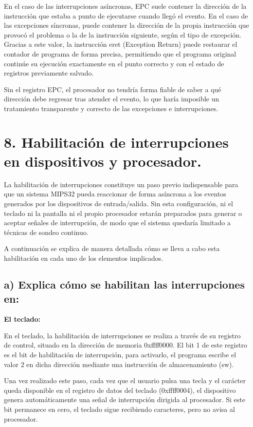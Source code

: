 \documentclass[12pt, letterpaper]{article}
\begin{document}
En el caso de las interrupciones asíncronas, EPC suele contener la dirección de la instrucción que estaba a punto de ejecutarse cuando llegó el evento. En el caso de las excepciones síncronas, puede contener la dirección de la propia instrucción que provocó el problema o la de la instrucción siguiente, según el tipo de excepción. Gracias a este valor, la instrucción eret (Exception Return) puede restaurar el contador de programa de forma precisa, permitiendo que el programa original continúe su ejecución exactamente en el punto correcto y con el estado de registros previamente salvado.

Sin el registro EPC, el procesador no tendría forma fiable de saber a qué dirección debe regresar tras atender el evento, lo que haría imposible un tratamiento transparente y correcto de las excepciones e interrupciones.\newpage

\section*{8. Habilitación de interrupciones en dispositivos y procesador.}

La habilitación de interrupciones constituye un paso previo indispensable para que un sistema MIPS32 pueda reaccionar de forma asíncrona a los eventos generados por los dispositivos de entrada/salida. Sin esta configuración, ni el teclado ni la pantalla ni el propio procesador estarán preparados para generar o aceptar señales de interrupción, de modo que el sistema quedaría limitado a técnicas de sondeo continuo.

A continuación se explica de manera detallada cómo se lleva a cabo esta habilitación en cada uno de los elementos implicados.

\subsection*{a) Explica cómo se habilitan las interrupciones en:}

\textbf{El teclado:}

En el teclado, la habilitación de interrupciones se realiza a través de su registro de control, situado en la dirección de memoria 0xffff0000. El bit 1 de este registro es el bit de habilitación de interrupción, para activarlo, el programa escribe el valor 2 en dicha dirección mediante una instrucción de almacenamiento (sw).

Una vez realizado este paso, cada vez que el usuario pulsa una tecla y el carácter queda disponible en el registro de datos del teclado (0xffff0004), el dispositivo genera automáticamente una señal de interrupción dirigida al procesador. Si este bit permanece en cero, el teclado sigue recibiendo caracteres, pero no avisa al procesador.
\end{document}
